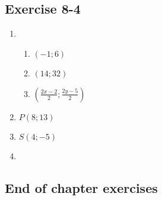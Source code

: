 \subsection{Exercise 8-4} %
\begin{enumerate}[itemsep=5pt, label=\textbf{\arabic*}. ]
\item %
  \begin{enumerate}[noitemsep, label=\textbf{(\alph*)} ]
\item $(-1 ; 6)$%
\item $(14 ; 32)$%
\item $(\frac{2x - 2}{2} ; \frac{2y - 5}{2})$%
\end{enumerate}

\item $P(8 ; 13)$%
\item $S(4 ; -5)$%

\item %
\end{enumerate}
\subsection{End of chapter exercises} %


